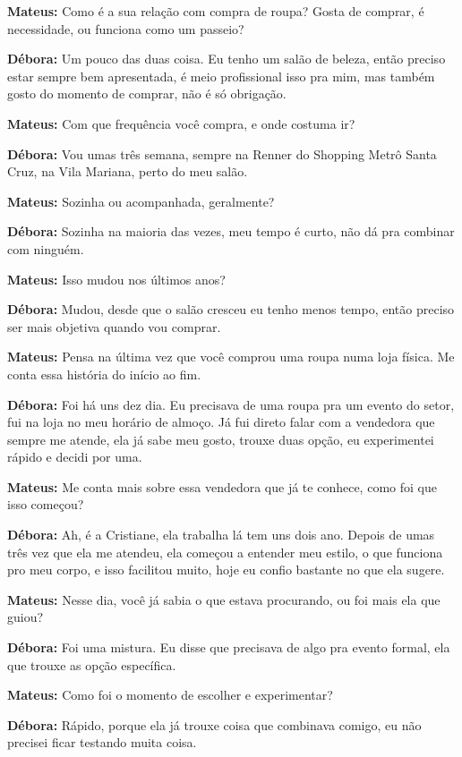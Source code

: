 \textbf{Mateus:} Como é a sua relação com compra de roupa? Gosta de comprar, é necessidade, ou funciona como um passeio?

\textbf{Débora:} Um pouco das duas coisa. Eu tenho um salão de beleza, então preciso estar sempre bem apresentada, é meio profissional isso pra mim, mas também gosto do momento de comprar, não é só obrigação.

\textbf{Mateus:} Com que frequência você compra, e onde costuma ir?

\textbf{Débora:} Vou umas três semana, sempre na Renner do Shopping Metrô Santa Cruz, na Vila Mariana, perto do meu salão.

\textbf{Mateus:} Sozinha ou acompanhada, geralmente?

\textbf{Débora:} Sozinha na maioria das vezes, meu tempo é curto, não dá pra combinar com ninguém.

\textbf{Mateus:} Isso mudou nos últimos anos?

\textbf{Débora:} Mudou, desde que o salão cresceu eu tenho menos tempo, então preciso ser mais objetiva quando vou comprar.

\textbf{Mateus:} Pensa na última vez que você comprou uma roupa numa loja física. Me conta essa história do início ao fim.

\textbf{Débora:} Foi há uns dez dia. Eu precisava de uma roupa pra um evento do setor, fui na loja no meu horário de almoço. Já fui direto falar com a vendedora que sempre me atende, ela já sabe meu gosto, trouxe duas opção, eu experimentei rápido e decidi por uma.

\textbf{Mateus:} Me conta mais sobre essa vendedora que já te conhece, como foi que isso começou?

\textbf{Débora:} Ah, é a Cristiane, ela trabalha lá tem uns dois ano. Depois de umas três vez que ela me atendeu, ela começou a entender meu estilo, o que funciona pro meu corpo, e isso facilitou muito, hoje eu confio bastante no que ela sugere.

\textbf{Mateus:} Nesse dia, você já sabia o que estava procurando, ou foi mais ela que guiou?

\textbf{Débora:} Foi uma mistura. Eu disse que precisava de algo pra evento formal, ela que trouxe as opção específica.

\textbf{Mateus:} Como foi o momento de escolher e experimentar?

\textbf{Débora:} Rápido, porque ela já trouxe coisa que combinava comigo, eu não precisei ficar testando muita coisa.

